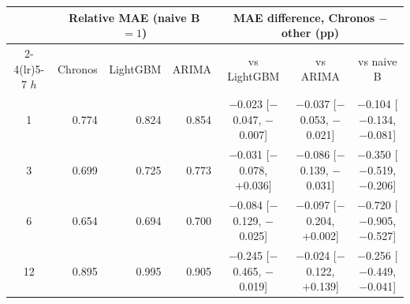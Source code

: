 \begin{tabular}{crrrccc}
\toprule
& \multicolumn{3}{c}{Relative MAE (naive B $=1$)} & \multicolumn{3}{c}{MAE difference, Chronos $-$ other (pp)} \\
\cmidrule(lr){2-4}\cmidrule(lr){5-7}
$h$ & Chronos & LightGBM & ARIMA & vs LightGBM & vs ARIMA & vs naive B \\
\midrule
1 & 0.774 & 0.824 & 0.854 & $-$0.023 [$-$0.047, $-$0.007] & $-$0.037 [$-$0.053, $-$0.021] & $-$0.104 [$-$0.134, $-$0.081] \\
3 & 0.699 & 0.725 & 0.773 & $-$0.031 [$-$0.078, +0.036] & $-$0.086 [$-$0.139, $-$0.031] & $-$0.350 [$-$0.519, $-$0.206] \\
6 & 0.654 & 0.694 & 0.700 & $-$0.084 [$-$0.129, $-$0.025] & $-$0.097 [$-$0.204, +0.002] & $-$0.720 [$-$0.905, $-$0.527] \\
12 & 0.895 & 0.995 & 0.905 & $-$0.245 [$-$0.465, $-$0.019] & $-$0.024 [$-$0.122, +0.139] & $-$0.256 [$-$0.449, $-$0.041] \\
\bottomrule
\end{tabular}

